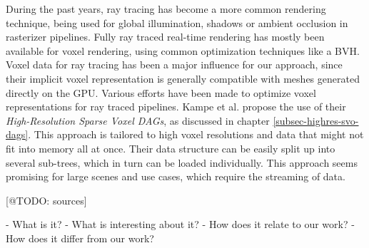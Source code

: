 \noindent
During the past years, ray tracing has become a more common rendering technique, being used for global illumination, 
shadows or ambient occlusion in rasterizer pipelines. Fully ray traced real-time rendering has mostly been available 
for voxel rendering, using common optimization techniques like a \ac{BVH}. Voxel data for ray tracing has been a 
major influence for our approach, since their implicit voxel representation is generally compatible with meshes 
generated directly on the \ac{GPU}. Various efforts have been made to optimize voxel representations for ray traced 
pipelines. Kampe et al. \cite{Kampe2013} propose the use of their \emph{High-Resolution Sparse Voxel \ac{DAG}s}, 
as discussed in chapter \ref{subsec-highres-svo-dags}. This approach is tailored to high voxel resolutions and data that 
might not fit into memory all at once. Their data structure can be easily split up into several sub-trees, which in turn 
can be loaded individually. This approach seems promising for large scenes and use cases, which require the streaming of 
data. 


[@TODO: sources]















- What is it?
- What is interesting about it?
- How does it relate to our work?
- How does it differ from our work?
